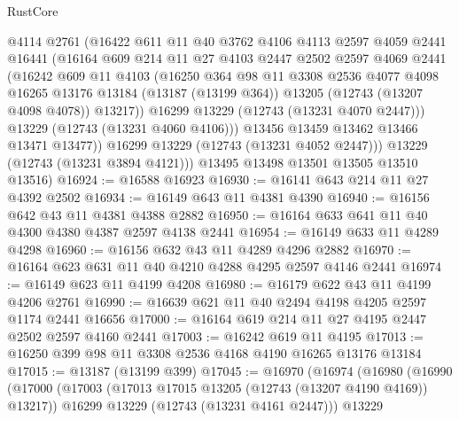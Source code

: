 \begin{lexlean}{RustCore}
\begin{coremodule}
              @4114
              @2761
              (@16422
                @611
                @11
                @40
                @3762
                @4106
                @4113
                @2597
                @4059
                @2441
                @16441
                (@16164
                  @609
                  @214
                  @11
                  @27
                  @4103
                  @2447
                  @2502
                  @2597
                  @4069
                  @2441
                  (@16242
                    @609
                    @11
                    @4103
                    (@16250
                      @364
                      @98
                      @11
                      @3308
                      @2536
                      @4077
                      @4098
                      @16265
                      @13176
                      @13184
                      (@13187 (@13199 @364))
                      @13205
                      (@12743 (@13207 @4098 @4078))
                      @13217))
                  @16299
                  @13229
                  (@12743 (@13231 @4070 @2447)))
                @13229
                (@12743 (@13231 @4060 @4106)))
              @13456
              @13459
              @13462
              @13466
              @13471
              @13477))
          @16299
          @13229
          (@12743 (@13231 @4052 @2447)))
        @13229
        (@12743 (@13231 @3894 @4121)))
      @13495
      @13498
      @13501
      @13505
      @13510
      @13516)
@16924 := @16588 @16923
@16930 := @16141 @643 @214 @11 @27 @4392 @2502
@16934 := @16149 @643 @11 @4381 @4390
@16940 := @16156 @642 @43 @11 @4381 @4388 @2882
@16950 := @16164 @633 @641 @11 @40 @4300 @4380 @4387 @2597 @4138 @2441
@16954 := @16149 @633 @11 @4289 @4298
@16960 := @16156 @632 @43 @11 @4289 @4296 @2882
@16970 := @16164 @623 @631 @11 @40 @4210 @4288 @4295 @2597 @4146 @2441
@16974 := @16149 @623 @11 @4199 @4208
@16980 := @16179 @622 @43 @11 @4199 @4206 @2761
@16990 := @16639 @621 @11 @40 @2494 @4198 @4205 @2597 @1174 @2441 @16656
@17000 := @16164 @619 @214 @11 @27 @4195 @2447 @2502 @2597 @4160 @2441
@17003 := @16242 @619 @11 @4195
@17013 := @16250 @399 @98 @11 @3308 @2536 @4168 @4190 @16265 @13176 @13184
@17015 := @13187 (@13199 @399)
@17045 := @16970
    (@16974
      (@16980
        (@16990
          (@17000
            (@17003 (@17013 @17015 @13205 (@12743 (@13207 @4190 @4169)) @13217))
            @16299
            @13229
            (@12743 (@13231 @4161 @2447)))
          @13229

\end{coremodule}
\end{lexlean}
